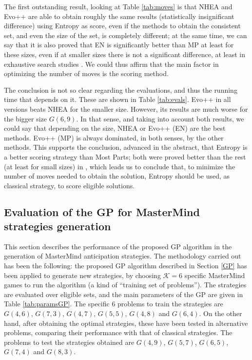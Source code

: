 The first outstanding result, looking at Table \ref{tab:moves} is that
NHEA and Evo++ are able to obtain roughly the same results
(statistically insignificant difference) using Entropy as score, even
if the methods to obtain the consistent set, and even the size of the
set, is completely different; at the same time, we can say that it is
also proved that EN is significantly better than MP at least for these
sizes, even if at smaller sizes there is not a significant difference,
at least in exhaustive search studies \cite{Merelo12}. We could thus
affirm that the main factor in optimizing the number of moves is the
scoring method.

The conclusion is not so clear regarding the evaluations, and thus the
running time that depends on it. These are shown in Table
\ref{tab:evals}. Evo++ in all versions beats NHEA for the smaller
size. However, its results are much worse for the bigger size
$G(6,9)$. In that sense, and taking into account both
results, we could say that depending on the size, NHEA or Evo++ (EN) are
the best methods. Evo++ (MP) is always dominated, in both senses, by
the other methods. This supports the conclusion, advanced in the
abstract, that Entropy is a better scoring strategy than Most Parts;
both were proved better than the rest (at least for small sizes) in
\cite{Runarsson10}, which leads us to conclude that, to minimize the
number of moves needed to obtain the solution, Entropy should be used, as classical strategy,
to score eligible solutions.

\subsection{Evaluation of the GP for MasterMind strategies generation}

This section describes the performance of the proposed GP algorithm in the generation of MasterMind anticipation strategies. The methodology carried out has been the following: the proposed GP algorithm described in Section \ref{GP} has been applied to generate new strategies, by choosing $\mathcal{K}=6$ specific MasterMind games to run the algorithm (a kind of ``training set of problems''). The strategies are evaluated over eligible sets, and the main parameters of the GP are given in Table \ref{tab:paramsGP}. The specific 6 problems to train the strategies are $G(4,6)$, $G(7,3)$, $G(4,7)$, $G(5,5)$, $G(4,8)$ and $G(6,4)$. On the other hand, after obtaining the optimal strategies, these have been tested in alternative problems, comparing their performance with that of classical strategies. The problems to test the strategies obtained are $G(4,9)$, $G(5,7)$, $G(6,5)$, $G(7,4)$ and $G(8,3)$.

